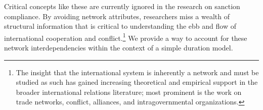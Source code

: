 Critical concepts like these are currently ignored in the research on sanction compliance. By avoiding network attributes, researchers miss a wealth of structural information that is critical to understanding the ebb and flow of international cooperation and conflict.\footnote{The insight that the international system is inherently a network and must be studied as such has gained increasing theoretical and empirical support in the broader international relations literature; most prominent is the work on trade networks,\cite{hoff2004modeling, ward:rainbow:2013} conflict,\cite{ward2007disputes} alliances,\cite{warren2010geometry} and intragovernmental organizations.\cite{cao2009networks,greenhill2010norm}} We provide a way to account for these network interdependencies within the context of a simple duration model.


